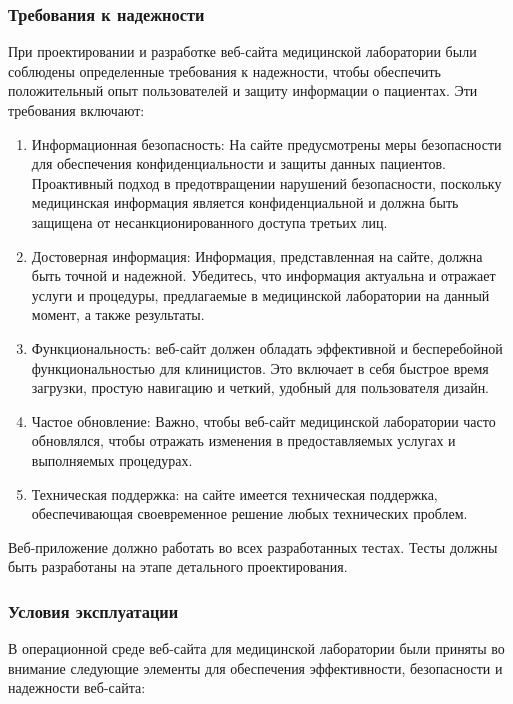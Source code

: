 \subsubsection{Требования к надежности}

При проектировании и разработке веб-сайта медицинской лаборатории были соблюдены определенные требования к надежности, чтобы обеспечить положительный опыт пользователей и защиту информации о пациентах. Эти требования включают:

\begin{enumerate}
	\item Информационная безопасность: На сайте предусмотрены меры безопасности для обеспечения конфиденциальности и защиты данных пациентов. Проактивный подход в предотвращении нарушений безопасности, поскольку медицинская информация является конфиденциальной и должна быть защищена от несанкционированного доступа третьих лиц.
	\item Достоверная информация: Информация, представленная на сайте, должна быть точной и надежной. Убедитесь, что информация актуальна и отражает услуги и процедуры, предлагаемые в медицинской лаборатории на данный момент, а также результаты.
	\item Функциональность: веб-сайт должен обладать эффективной и бесперебойной функциональностью для клиницистов. Это включает в себя быстрое время загрузки, простую навигацию и четкий, удобный для пользователя дизайн.
	\item Частое обновление: Важно, чтобы веб-сайт медицинской лаборатории часто обновлялся, чтобы отражать изменения в предоставляемых услугах и выполняемых процедурах.
	\item Техническая поддержка: на сайте имеется техническая поддержка, обеспечивающая своевременное решение любых технических проблем.
\end{enumerate}

Веб-приложение должно работать во всех разработанных тестах. Тесты должны быть разработаны 
на этапе детального проектирования.

\subsubsection{Условия эксплуатации}

В операционной среде веб-сайта для медицинской лаборатории были приняты во внимание следующие элементы для обеспечения эффективности, безопасности и надежности веб-сайта:

